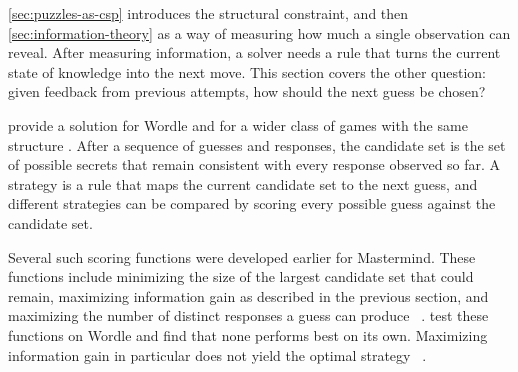 \label{sec:strategies}
\autoref{sec:puzzles-as-csp} introduces the structural constraint, and then \autoref{sec:information-theory} as a way of measuring how much a single observation can reveal. After measuring information, a solver needs a rule that turns the current state of knowledge into the next move. This section covers the other question: given feedback from previous attempts, how should the next guess be chosen?



\citeauthor{cunananOptimalStrategiesWordle2023} provide a solution for Wordle and for a wider class of games with the same structure \cite{cunananOptimalStrategiesWordle2023}. After a sequence of guesses and responses, the candidate set is the set of possible secrets that remain consistent with every response observed so far. A strategy is a rule that maps the current candidate set to the next guess, and different strategies can be compared by scoring every possible guess against the candidate set.

Several such scoring functions were developed earlier for Mastermind. These functions include minimizing the size of the largest candidate set that could remain, maximizing information gain as described in the previous section, and maximizing the number of distinct responses a guess can produce ~\cite{knuthComputerMasterMind1976}. \citeauthor{cunananOptimalStrategiesWordle2023} test these functions on Wordle and find that none performs best on its own. Maximizing information gain in particular does not yield the optimal strategy ~\cite{cunananOptimalStrategiesWordle2023}.